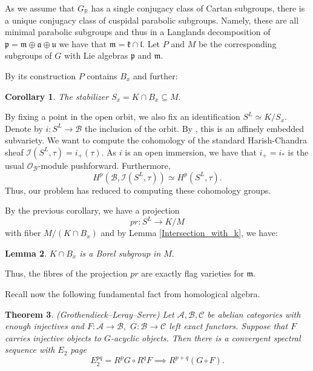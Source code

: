 \documentclass[letterpaper,twosided,11pt]{article}
\theoremstyle{plain}
\newtheorem{theorem}{Theorem}[section]
\newtheorem{lemma}[theorem]{Lemma}
\newtheorem{corollary}[theorem]{Corollary}
\theoremstyle{definition}
\theoremstyle{remark}
\newcommand{\R}{\mathbb{R}}
\newcommand{\ds}{\oplus}
\newcommand{\comp}{\circ}
\newcommand{\lie}[1]{\mathfrak{#1}}
\begin{document}
As we assume that $G_\R$ has a single conjugacy class of Cartan subgroups, there is 
a unique conjugacy class of cuspidal parabolic subgroups. Namely, these are all minimal parabolic 
subgroups and thus in a Langlands decomposition of $\lie{p}=\lie{m}\ds\lie{a}\ds\lie{u}$
 we have that $\lie{m}=\lie{k}\cap \lie{l}.$ Let $P$ and $M$ be the 
 corresponding subgroups of $G$ with Lie algebras $\lie{p}$ and $\lie{m}.$

By its construction $P$ contains $B_x$ and further:

\begin{corollary} 
	The stabilizer $S_x=K\cap B_x\subseteq M.$  
\end{corollary} 

By fixing a point in the open orbit, we also fix an identification $S^L\simeq K/S_x.$ Denote
 by $i:S^L\to \mathcal{B}$ the inclusion of the orbit. By \cite{Hecht1987}, this is an affinely 
 embedded subvariety. We want to compute the cohomology of the standard
  Harish-Chandra sheaf $\mathcal{I}(S^L,\tau)=i_+(\tau).$ As $i$ is an open 
  immersion, we have that  $i_+=i_*$ is the usual $\mathcal{O}_\mathcal{B}$-module pushforward. 
  Furthermore, \[ H^p(\mathcal{B},\mathcal{I}(S^L,\tau))\simeq H^p(S^L,\tau).\]
   Thus, our problem has reduced to computing these cohomology groups. 
   
   By the previous corollary, we have a projection \[ pr: S^L\to K/M\] with fiber 
   $M/(K\cap B_x)$ and by Lemma \ref{Intersection_with_k}, we have:
   
   \begin{lemma}\label{Fibers_of_pr}
   	$K\cap B_x$ is a Borel subgroup in $M.$ 
   \end{lemma}   
  Thus, the fibres of the projection $pr$ are exactly flag varieties for $\lie{m}.$  

Recall now the following fundamental fact from homological algebra. 

\begin{theorem}(Grothendieck--Leray--Serre) 
	Let $\mathcal{A},\mathcal{B},\mathcal{C}$ be abelian categories with enough
	 injectives and $F:\mathcal{A}\to \mathcal{B},$ $G:\mathcal{B}\to \mathcal{C}$ 
	 left exact functors. Suppose that $F$ carries injective objects to $G$-acyclic objects. 
	 Then there is a convergent spectral sequence with $E_2$ page 
	 \[ E_2^{pq}=R^pG\comp R^qF\implies R^{p+q}(G\comp F). \]
\end{theorem} 
\end{document}
